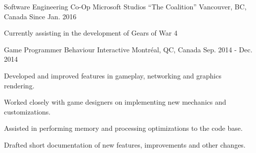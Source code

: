 

\begin{cventries}

  \cventry
    {Software Engineering Co-Op} %
    {Microsoft Studios ``The Coalition''} %
    {Vancouver, BC, Canada} %
    {Since Jan. 2016} %
    {
      \begin{cvitems} %
        \item {Currently assisting in the development of Gears of War 4}
        \\
      \end{cvitems}
    }

  \cventry
    {Game Programmer} %
    {Behaviour Interactive} %
    {Montréal, QC, Canada} %
    {Sep. 2014 - Dec. 2014} %
    {
      \begin{cvitems} %
        \item {Developed and improved features in gameplay, networking and graphics rendering.}
        \item {Worked closely with game designers on implementing new mechanics and customizations.}
        \item {Assisted in performing memory and processing optimizations to the code base.}
        \item {Drafted short documentation of new features, improvements and other changes.}
        \\
      \end{cvitems}
    }

\end{cventries}
